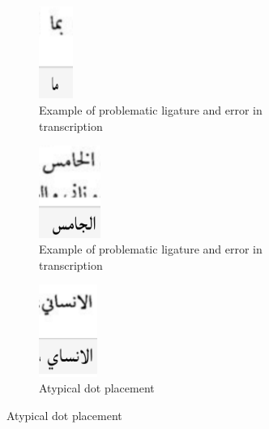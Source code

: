 \begin{figure}[!ht]
	\centering
	\begin{subfigure}[t]{0.3\linewidth}
	\centering
	\includegraphics[height=3cm]{images/image21.png}
	\caption{Example of problematic ligature and error in transcription}
	\label{fig3:fig9}
	\end{subfigure}
	\begin{subfigure}[t]{0.3\linewidth}
	\centering
	\includegraphics[height=3cm]{images/image23.png}
	\caption{Example of problematic ligature and error in transcription}
	\label{fig3:fig10}
	\end{subfigure}
	\begin{subfigure}[t]{0.3\linewidth}
	\centering
	\includegraphics[height=3cm]{images/image22.png}
	\caption{Atypical dot placement}
	\label{fig3:fig11}
	\end{subfigure}


\end{figure}
